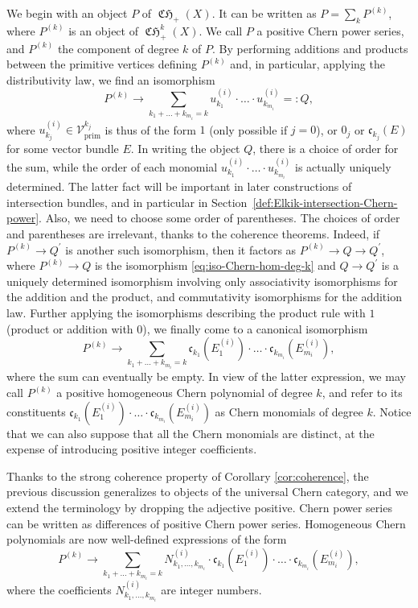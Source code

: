 \documentclass[JEP,XML,SOM,Unicode,published]{cedram}
\theoremstyle{plain}
\theoremstyle{definition}
\newcommand{\Vcal}{\mathcal V}
\newcommand{\cfrak}{\mathfrak c}
\newcommand{\prim}{\mathrm{prim}}
\DeclareMathOperator{\CHfrak}{\mathfrak{CH}}
\begin{document}
We begin with an object $P$ of $\CHfrak_{+}(X)$. It can be written as $P=\sum_{k}P^{(k)}$, where $P^{(k)}$ is an object of $\CHfrak^{k}_{+}(X)$. We call $P$ a positive Chern power series, and $P^{(k)}$ the component of degree $k$ of $P$. By performing additions and products between the primitive vertices defining $P^{(k)}$ and, in particular, applying the distributivity law, we find an isomorphism
\begin{equation}\label{eq:iso-Chern-hom-deg-k}
P^{(k)}\to \sum_{k_{1}+\ldots+k_{m_{i}}=k}u_{k_{1}}^{(i)}\cdot\ldots\cdot u_{k_{m_{i}}}^{(i)}=:Q,
\end{equation}
where $u_{k_{j}}^{(i)}\in\Vcal^{k_{j}}_{\prim}$ is thus of the form $1$ (only possible if $j=0$), or $0_{j}$ or $\cfrak_{k_{j}}(E)$ for some vector bundle $E$. In writing the object $Q$, there is a choice of order for the sum, while the order of each monomial $u_{k_{1}}^{(i)}\cdot\ldots\cdot u_{k_{m_{i}}}^{(i)}$ is actually uniquely determined. The latter fact will be important in later constructions of intersection bundles, and in particular in Section~\ref{def:Elkik-intersection-Chern-power}. Also, we need to choose some order of parentheses. The choices of order and parentheses are irrelevant, thanks to the coherence theorems. Indeed, if $P^{(k)}\to Q^{\prime}$ is another such isomorphism, then it factors as $P^{(k)}\to Q\to Q^{\prime}$, where $P^{(k)}\to Q$ is the isomorphism \eqref{eq:iso-Chern-hom-deg-k} and $Q\to Q^{\prime}$ is a uniquely determined isomorphism involving only associativity isomorphisms for the addition and the product, and commutativity isomorphisms for the addition law. Further applying the isomorphisms describing the product rule with $1$ (\resp product or addition with $0$), we finally come to a canonical isomorphism
\begin{equation}\label{eq:iso-Chern-hom-deg-k-bis}
P^{(k)}\to \sum_{k_{1}+\ldots+k_{m_{i}}=k}\cfrak_{k_{1}}(E_{1}^{(i)})\cdot\ldots\cdot \cfrak_{k_{m_{i}}}(E_{m_{i}}^{(i)}),
\end{equation}
where the sum can eventually be empty. In view of the latter expression, we may call $P^{(k)}$ a positive homogeneous Chern polynomial of degree $k$, and refer to its constituents $\cfrak_{k_{1}}(E_{1}^{(i)})\cdot\ldots\cdot \cfrak_{k_{m_{i}}}(E_{m_{i}}^{(i)})$ as Chern monomials of degree $k$. Notice that we can also suppose that all the Chern monomials are distinct, at the expense of introducing positive integer coefficients.

Thanks to the strong coherence property of Corollary \ref{cor:coherence}, the previous discussion generalizes to objects of the universal Chern category, and we extend the terminology by dropping the adjective positive. Chern power series can be written as differences of positive Chern power series. Homogeneous Chern polynomials are now well-defined expressions of the form
\begin{displaymath}
P^{(k)}\to \sum_{k_{1}+\ldots+k_{m_{i}}=k}N_{k_{1},\ldots,k_{m_{i}}}^{(i)}\cdot\cfrak_{k_{1}}(E_{1}^{(i)})\cdot\ldots\cdot \cfrak_{k_{m_{i}}}(E_{m_{i}}^{(i)}),
\end{displaymath}
where the coefficients $N_{k_{1},\ldots,k_{m_{i}}}^{(i)}$ are integer numbers.
\end{document}
